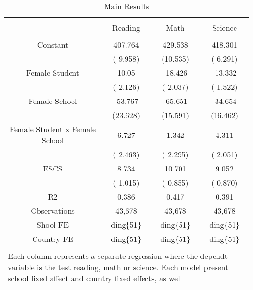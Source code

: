
\begin{table}[!htbp] \centering 
  \caption{Main Results} 
  \label{Tab2} 
\scriptsize 
\begin{tabular}{@{\extracolsep{5pt}} cccc} 
\\[-1.8ex]\hline 
\hline \\[-1.8ex] 
 & Reading & Math & Science \\ 
\hline \\[-1.8ex] 
Constant & 407.764 & 429.538 & 418.301 \\ 
 & ( 9.958) & (10.535) & ( 6.291) \\ 
Female Student & 10.05 & -18.426 & -13.332 \\ 
 & ( 2.126) & ( 2.037) & ( 1.522) \\ 
Female School & -53.767 & -65.651 & -34.654 \\ 
 & (23.628) & (15.591) & (16.462) \\ 
Female Student x Female School & 6.727 & 1.342 & 4.311 \\ 
 & ( 2.463) & ( 2.295) & ( 2.051) \\ 
ESCS & 8.734 & 10.701 & 9.052 \\ 
 & ( 1.015) & ( 0.855) & ( 0.870) \\ 
R2 & 0.386 & 0.417 & 0.391 \\ 
Observations & 43,678 & 43,678 & 43,678 \\ 
Shool FE & ding\{51\} & ding\{51\} & ding\{51\} \\ 
Country FE & ding\{51\} & ding\{51\} & ding\{51\} \\ 
\hline \\[-1.8ex] 
\multicolumn{4}{l}{Each column represents a separate regression where the dependt variable is the test reading, math or science. Each model present  school fixed affect and country fixed effects, as well} \\ 
\end{tabular} 
\end{table} 
